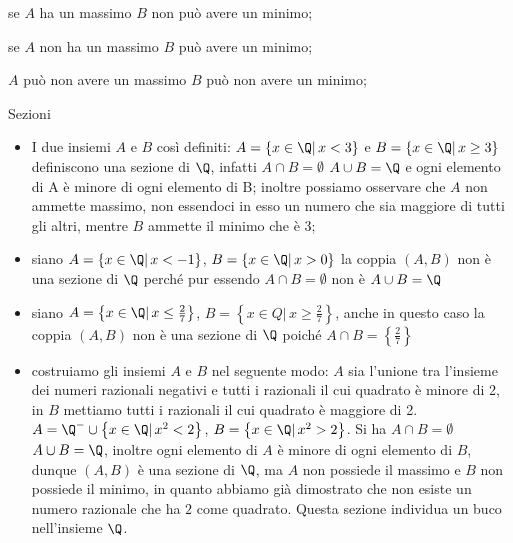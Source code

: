 \begin{itemize*}
 \item se \(A\) ha un massimo \(B\) non può avere un minimo;
 \item se \(A\) non ha un massimo \(B\) può avere un minimo;
 \item \(A\) può non avere un massimo \(B\) può non avere un minimo;
\end{itemize*}


\begin{exrig}
 \begin{esempio}
 Sezioni
 \begin{itemize}
 \item I due insiemi \(A\) e \(B\) così definiti: 
 \(A=\left\{x\in \Q |\, x<3\right\}\) e
\(B=\left\{x\in \Q |\, x \ge 3\right\}\) 
definiscono una sezione di \(\Q\), 
infatti \(A \cap B=\emptyset\) \(A \cup B=\Q\) e ogni elemento di A è 
minore 
di ogni elemento di B; 
inoltre possiamo osservare che \(A\) non ammette massimo,
non essendoci in esso un numero che sia maggiore di tutti gli altri, 
mentre \(B\) ammette il minimo che è 3;
 \item siano \(A=\left\{x\in \Q |\, x<-1\right\}\), \(B=\left\{x \in \Q 
|\, 
x>0\right\}\) la coppia \((A,B)\) non è una sezione di \(\Q\) perché pur 
essendo 
\(A\cap B=\emptyset\) non è \(A\cup B=\Q\)
 \item siano \(A=\left\{x\in \Q |\, x \le \frac{2}{7}\right\}\), 
\(B=\left\{x 
\in Q |\, x \ge \frac{2}{7}\right\}\), anche in questo caso la coppia 
\((A,B)\) 
non 
è una sezione di \(\Q\) poiché \(A\cap B=\left\{\frac{2}{7}\right\}\)
 \item costruiamo gli insiemi \(A\) e \(B\) nel seguente modo: \(A\) sia 
l'unione tra 
l'insieme dei numeri razionali negativi e tutti i razionali il cui quadrato è 
minore di 2, in \(B\) mettiamo tutti i razionali il cui quadrato è maggiore 
di 
2. 
\(A=\Q^{-} \cup \left\{x \in \Q |\, x^{2}<2\right\}\), \(B=\left\{x \in 
\Q 
|\, x^{2}>2\right\}\). Si ha \(A \cap B=\emptyset\) \(A\cup B=\Q\), 
inoltre 
ogni 
elemento di \(A\) è minore di ogni elemento di \(B\), dunque \((A,B)\) è una 
sezione 
di \(\Q\), ma \(A\) non possiede il massimo e \(B\) non possiede il 
minimo, 
in 
quanto abbiamo già dimostrato che non esiste un numero razionale che ha \(2\) 
come 
quadrato. Questa sezione individua un buco nell'insieme \(\Q\).
 \end{itemize}
 \end{esempio}
\end{exrig}


